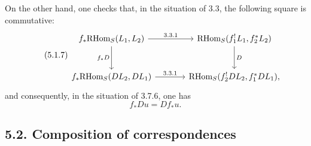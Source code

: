\documentclass[11pt]{article}
\providecommand{\RHom}{\mathrm{RHom}}
\providecommand{\RHom}{\mathrm{RHom}}
\providecommand{\RHom}{\mathrm R\mathcal{H}om}
\providecommand{\RHom}{\mathrm{RHom}}
\begin{document}
On the other hand, one checks that, in the situation of 3.3, the following square is commutative:
\begin{equation}
\tag{5.1.7}
\begin{tikzcd}[column sep=large,row sep=large]
f_*\RHom_S(L_1,L_2) \arrow[r,"3.3.1"] \arrow[d,"f_*D"']
& \RHom_S(f_1^!L_1,f_2^*L_2) \arrow[d,"D"] \\
f_*\RHom_S(DL_2,DL_1) \arrow[r,"3.3.1"]
& \RHom_S(f_2^!DL_2,f_1^*DL_1),
\end{tikzcd}
\end{equation}
and consequently, in the situation of 3.7.6, one has
\begin{equation}
\tag{5.1.8}
f_*Du=Df_*u.
\end{equation}

\subsection*{5.2. Composition of correspondences}
\end{document}
